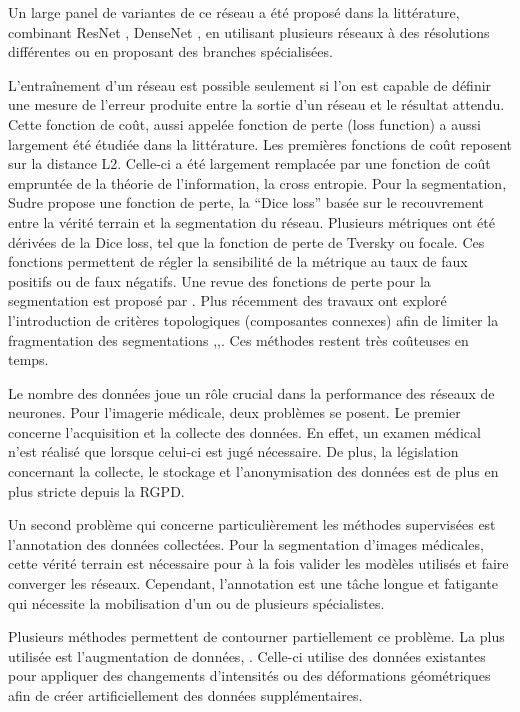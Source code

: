 Un large panel de variantes de ce réseau a été proposé dans la littérature, combinant ResNet \cite{yu2019_liver_ResUnet}, DenseNet \cite{Li2018_DenseUnet}, en utilisant plusieurs réseaux à des résolutions différentes ou en proposant des branches spécialisées.

L'entraînement d'un réseau est possible seulement si l'on est capable de définir une mesure de l'erreur produite entre la sortie d'un réseau et le résultat attendu. Cette fonction de coût, aussi appelée fonction de perte (loss function) a aussi largement été étudiée dans la littérature. Les premières fonctions de coût reposent sur la distance L2. Celle-ci a été largement remplacée par une fonction de coût empruntée de la théorie de l'information, la cross entropie. Pour la segmentation, Sudre \cite{Sudre2017_DiceLoss} propose une fonction de perte, la ``Dice loss'' basée sur le recouvrement entre la vérité terrain et la segmentation du réseau. Plusieurs métriques ont été dérivées de la Dice loss, tel que la fonction de perte de Tversky ou focale. Ces fonctions permettent de régler la sensibilité de la métrique au taux de faux positifs ou de faux négatifs. Une revue des fonctions de perte pour la segmentation est proposé par \cite{Jadon2020_survey_seg_loss}. Plus récemment des travaux ont exploré l'introduction de critères topologiques (composantes connexes) afin de limiter la fragmentation des segmentations \cite{Hu2019_topo_homo_persi},\cite{Clough2019_topo_homo_persi},\cite{Ventura2017iterative_topo}. Ces méthodes restent très coûteuses en temps.


Le nombre des données joue un rôle crucial dans la performance des réseaux de neurones. Pour l'imagerie médicale, deux problèmes se posent. Le premier concerne l'acquisition et la collecte des données. En effet, un examen médical n'est réalisé que lorsque celui-ci est jugé nécessaire. De plus, la législation concernant la collecte, le stockage et l'anonymisation des données est de plus en plus stricte depuis la RGPD.

Un second problème qui concerne particulièrement les méthodes supervisées est l'annotation des données collectées. Pour la segmentation d'images médicales, cette vérité terrain est nécessaire pour à la fois valider les modèles utilisés et faire converger les réseaux. Cependant, l'annotation est une tâche longue et fatigante qui nécessite la mobilisation d'un ou de plusieurs spécialistes.

Plusieurs méthodes permettent de contourner partiellement ce problème. La plus utilisée est l'augmentation de données, \cite{Liskowski2016_data_augmentation}. Celle-ci utilise des données existantes pour appliquer des changements d'intensités ou des déformations géométriques afin de créer artificiellement des données supplémentaires.

